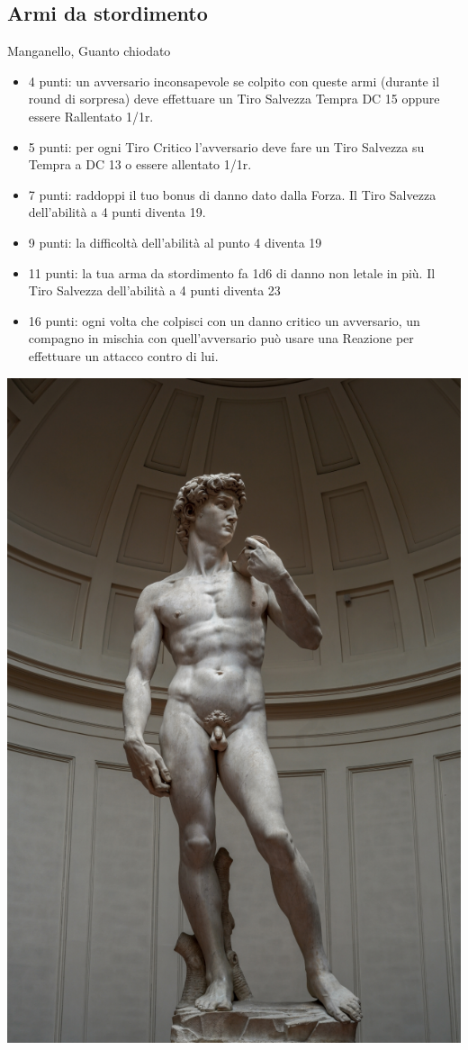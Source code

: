\begin{multicols}{2}
\subsection{Armi da stordimento} Manganello, Guanto chiodato\label{listaarmistordimento}

\begin{itemize}[leftmargin=*] \setlength{\itemsep}{0pt}
\item 4 punti: un avversario inconsapevole se colpito con queste armi (durante il round di sorpresa) deve effettuare un Tiro Salvezza Tempra DC 15 oppure essere Rallentato 1/1r.
\item 5 punti: per ogni Tiro Critico l'avversario deve fare un Tiro Salvezza su Tempra a DC 13 o essere allentato 1/1r.
\item 7 punti: raddoppi il tuo bonus di danno dato dalla Forza. Il Tiro Salvezza dell'abilità a 4 punti diventa 19.
\item 9 punti: la difficoltà dell'abilità al punto 4 diventa 19
\item 11 punti: la tua arma da stordimento fa 1d6 di danno non letale in più. Il Tiro Salvezza dell'abilità a 4 punti diventa 23
\item 16 punti: ogni volta che colpisci con un danno critico un avversario, un compagno in mischia con quell'avversario può usare una Reazione per effettuare un attacco contro di lui.

\end{itemize}

\begin{center}
	\includegraphics[width=0.7\linewidth]{immagini/david di Michelangelo.png}


\end{center}
\end{multicols}

